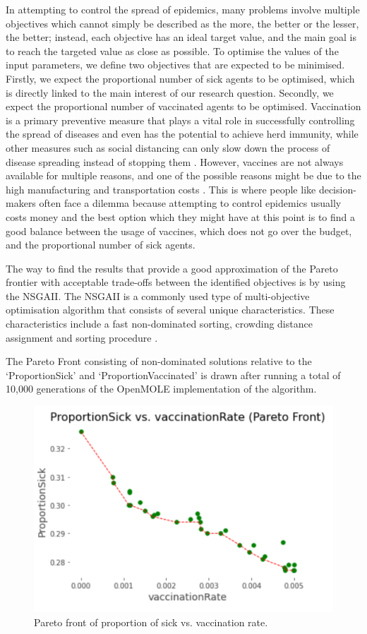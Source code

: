 \documentclass[smallextended]{svjour3}       %
\begin{document}
In attempting to control the spread of epidemics, many problems involve multiple objectives which cannot simply be described as the more, the better or the lesser, the better; instead, each objective has an ideal target value, and the main goal is to reach the targeted value as close as possible. To optimise the values of the input parameters, we define two objectives that are expected to be minimised. Firstly, we expect the proportional number of sick agents to be optimised, which is directly linked to the main interest of our research question. Secondly, we expect the proportional number of vaccinated agents to be optimised. Vaccination is a primary preventive measure that plays a vital role in successfully controlling the spread of diseases and even has the potential to achieve herd immunity, while other measures such as social distancing can only slow down the process of disease spreading instead of stopping them \cite{bicher2022model}. However, vaccines are not always available for multiple reasons, and one of the possible reasons might be due to the high manufacturing and transportation costs \cite{plotkin2017complexity}. This is where people like decision- makers often face a dilemma because attempting to control epidemics usually costs money and the best option which they might have at this point is to find a good balance between the usage of vaccines, which does not go over the budget, and the proportional number of sick agents.

The way to find the results that provide a good approximation of the Pareto frontier with acceptable trade-offs between the identified objectives is by using the NSGAII. The NSGAII is a commonly used type of multi-objective optimisation algorithm that consists of several unique characteristics. These characteristics include a fast non-dominated sorting, crowding distance assignment and sorting procedure \cite{deb2002fast}.

The Pareto Front consisting of non-dominated solutions relative to the ‘ProportionSick’ and ‘ProportionVaccinated’ is drawn after running a total of 10,000 generations of the OpenMOLE implementation of the algorithm.


\begin{figure}
	\centering
	\includegraphics[width=0.6\linewidth]{figures/pareto.png}
	\caption{Pareto front of proportion of sick vs. vaccination rate.\label{fig:pareto}}	
\end{figure}
\end{document}
